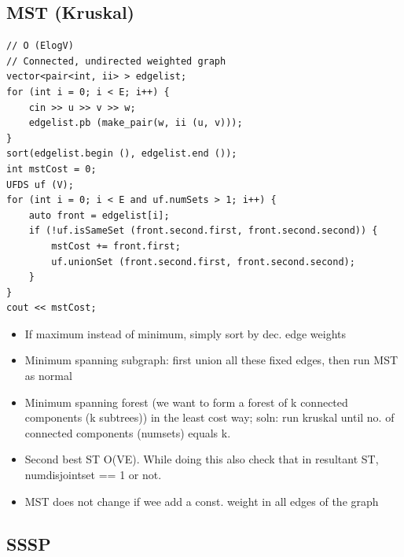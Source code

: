 \documentclass[8pt, a4paper, oneside, twocolumn]{extarticle}
\begin{document}
\subsection{MST (Kruskal)}
\begin{verbatim}
// O (ElogV)
// Connected, undirected weighted graph
vector<pair<int, ii> > edgelist;
for (int i = 0; i < E; i++) {
    cin >> u >> v >> w;
    edgelist.pb (make_pair(w, ii (u, v)));
}
sort(edgelist.begin (), edgelist.end ());
int mstCost = 0;
UFDS uf (V);
for (int i = 0; i < E and uf.numSets > 1; i++) {
    auto front = edgelist[i];
    if (!uf.isSameSet (front.second.first, front.second.second)) {
        mstCost += front.first;
        uf.unionSet (front.second.first, front.second.second);
    }
}
cout << mstCost;
\end{verbatim}
\begin{itemize}
    \item If maximum instead of minimum, simply sort by dec. edge weights
    \item Minimum spanning subgraph: first union all these fixed edges, then run MST as normal
    \item Minimum spanning forest (we want to form a forest of k connected components (k subtrees)) in the least cost way; soln: run kruskal until no. of connected components (numsets) equals k.
    \item Second best ST O(VE). While doing this also check that in resultant ST, numdisjointset == 1 or not.
    \item MST does not change if wee add a const. weight in all edges of the graph
\end{itemize}
\subsection{SSSP}
\end{document}
